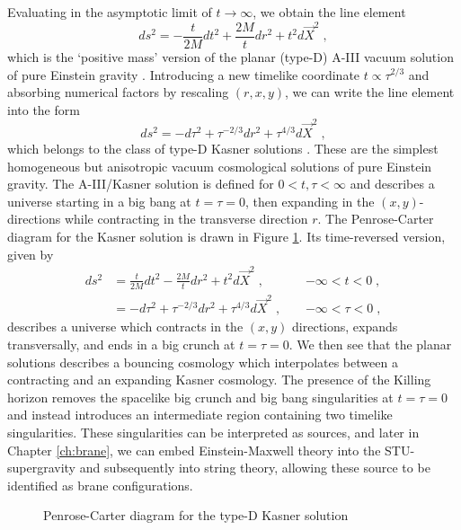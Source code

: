 Evaluating  in the asymptotic limit of $t\rightarrow \infty$, we obtain the line element
\begin{equation}
ds^2 = - \frac{t}{2M} dt^2 + \frac{2M}{t} dr^2 + t^2 d\vec{X}^2 \;,
\end{equation}
which is the `positive mass' version of the planar (type-D) A-III vacuum solution of pure Einstein gravity \cite{Griffiths:2009dfa}. Introducing a new timelike coordinate $t \propto \tau^{2/3}$ and absorbing numerical factors by rescaling $(r,x,y)$, we can write the line element into the form
\begin{equation}
ds^2 = -d\tau^2 + \tau^{-2/3} dr^2 + \tau^{4/3} d\vec{X}^2 \;,
\end{equation}
which belongs to the class of type-D Kasner solutions \cite{Kasner:1921zz}. These are the simplest homogeneous but anisotropic vacuum cosmological solutions of pure Einstein gravity. The A-III/Kasner solution is defined for $0<t,\tau <\infty$ and describes a universe starting in a big bang at $t=\tau=0$, then expanding in the $(x,y)$-directions while contracting in the transverse direction $r$. The Penrose-Carter diagram for the Kasner solution is drawn in Figure \ref{fig:kasnerpc}. Its time-reversed version, given by 
\begin{equation*}
	\begin{aligned}
		ds^2 &= \frac{t}{2M} dt^2 - \frac{2M}{t} dr^2 + t^2 d\vec{X}^2 \;,\;\;\;
&-\infty < t < 0 \;, \\
&=  -d\tau^2 + \tau^{-2/3} dr^2 + \tau^{4/3} d\vec{X}^2\;, \;\;\;\; &-\infty < \tau < 0\;,
	\end{aligned}
\end{equation*}
describes a universe which contracts in the $(x,y)$ directions, expands transversally, and ends in a big crunch at $t=\tau=0$. We then see that the planar solutions describes a bouncing cosmology which interpolates between a contracting and an expanding Kasner cosmology. The presence of the Killing horizon removes the spacelike big crunch and big bang singularities at $t=\tau=0$ and instead introduces an intermediate region containing two timelike singularities. These singularities can be interpreted as sources, and later in Chapter \ref{ch:brane}, we can embed Einstein-Maxwell theory into the STU-supergravity and subsequently into string theory, allowing these source to be identified as brane configurations. 

\begin{figure}[h]
\centering
{}
\caption[Penrose-Carter diagram for type-D Kasner solution]{Penrose-Carter diagram for the type-D Kasner solution}
\label{fig:kasnerpc}
\end{figure}


